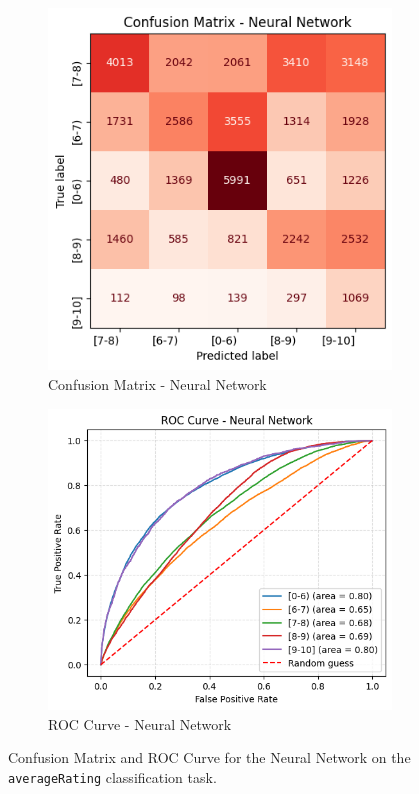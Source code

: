 \begin{figure}
    \centering
    \begin{subfigure}[b]{0.44\textwidth}
        \centering
        \includegraphics[width=\textwidth]{plotsss/cm_nn_rating.png}
        \caption{Confusion Matrix - Neural Network}
        \label{fig:cm_nn_rating}
    \end{subfigure}
    \hfill
    \begin{subfigure}[b]{0.52\textwidth}
        \centering
        \includegraphics[width=\textwidth]{plotsss/roc_nn_rating.png}
        \caption{ROC Curve - Neural Network}
        \label{fig:roc_nn_rating}
    \end{subfigure}
    \caption{Confusion Matrix and ROC Curve for the Neural Network on the \texttt{averageRating} classification task.}
    \label{fig:cm_nn_rating}
\end{figure}


